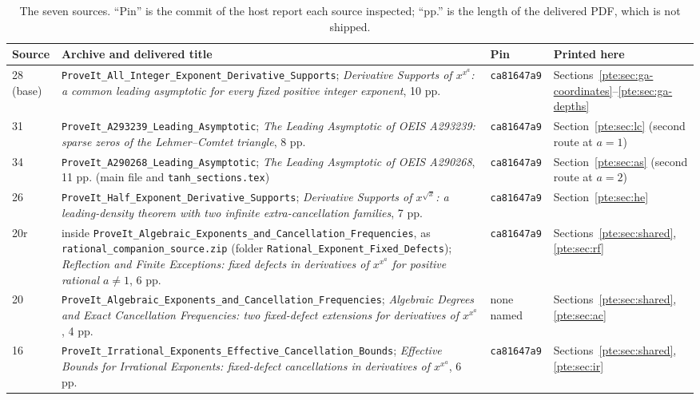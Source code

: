 \documentclass[11pt,a4paper]{article}
\numberwithin{equation}{section}
\theoremstyle{definition}
\theoremstyle{plain}
\begin{document}
\begin{table}[ht]
\centering\small
\caption{The seven sources.  ``Pin'' is the commit of the host report each source inspected; ``pp.'' is the length of the delivered PDF, which is not shipped.}\label{pte:tab:sources}
\begin{tabular}{@{}l>{\raggedright\arraybackslash}p{}l>{\raggedright\arraybackslash}p{}@{}}
\toprule
Source & Archive and delivered title & Pin & Printed here\\
\midrule
28 (base) & \texttt{ProveIt\_\allowbreak{}All\_\allowbreak{}Integer\_\allowbreak{}Exponent\_\allowbreak{}Derivative\_\allowbreak{}Supports}; \emph{Derivative Supports of $x^{x^a}$: a common leading asymptotic for every fixed positive integer exponent}, 10 pp. & \texttt{ca81647a9} & Sections~\ref{pte:sec:ga-coordinates}--\ref{pte:sec:ga-depths}\\
31 & \texttt{ProveIt\_\allowbreak{}A293239\_\allowbreak{}Leading\_\allowbreak{}Asymptotic}; \emph{The Leading Asymptotic of OEIS A293239: sparse zeros of the Lehmer--Comtet triangle}, 8 pp. & \texttt{ca81647a9} & Section~\ref{pte:sec:lc} (second route at $a=1$)\\
34 & \texttt{ProveIt\_\allowbreak{}A290268\_\allowbreak{}Leading\_\allowbreak{}Asymptotic}; \emph{The Leading Asymptotic of OEIS A290268}, 11 pp. (main file and \texttt{tanh\_\allowbreak{}sections.\allowbreak{}tex}) & \texttt{ca81647a9} & Section~\ref{pte:sec:as} (second route at $a=2$)\\
26 & \texttt{ProveIt\_\allowbreak{}Half\_\allowbreak{}Exponent\_\allowbreak{}Derivative\_\allowbreak{}Supports}; \emph{Derivative Supports of $x^{\sqrt x}$: a leading-density theorem with two infinite extra-cancellation families}, 7 pp. & \texttt{ca81647a9} & Section~\ref{pte:sec:he}\\
20r & inside \texttt{ProveIt\_\allowbreak{}Algebraic\_\allowbreak{}Exponents\_\allowbreak{}and\_\allowbreak{}Cancellation\_\allowbreak{}Frequencies}, as \texttt{rational\_\allowbreak{}companion\_\allowbreak{}source.\allowbreak{}zip} (folder \texttt{Rational\_\allowbreak{}Exponent\_\allowbreak{}Fixed\_\allowbreak{}Defects}); \emph{Reflection and Finite Exceptions: fixed defects in derivatives of $x^{x^a}$ for positive rational $a\ne1$}, 6 pp. & \texttt{ca81647a9} & Sections~\ref{pte:sec:shared}, \ref{pte:sec:rf}\\
20 & \texttt{ProveIt\_\allowbreak{}Algebraic\_\allowbreak{}Exponents\_\allowbreak{}and\_\allowbreak{}Cancellation\_\allowbreak{}Frequencies}; \emph{Algebraic Degrees and Exact Cancellation Frequencies: two fixed-defect extensions for derivatives of $x^{x^a}$}, 4 pp. & none named & Sections~\ref{pte:sec:shared}, \ref{pte:sec:ac}\\
16 & \texttt{ProveIt\_\allowbreak{}Irrational\_\allowbreak{}Exponents\_\allowbreak{}Effective\_\allowbreak{}Cancellation\_\allowbreak{}Bounds}; \emph{Effective Bounds for Irrational Exponents: fixed-defect cancellations in derivatives of $x^{x^a}$}, 6 pp. & \texttt{ca81647a9} & Sections~\ref{pte:sec:shared}, \ref{pte:sec:ir}\\
\bottomrule
\end{tabular}
\end{table}
\end{document}
